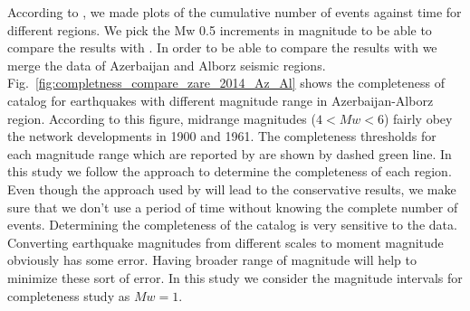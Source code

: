  According to   \citet{Frankel1995},  we made plots of the cumulative number of events against time for different regions. We pick the Mw 0.5 increments in magnitude to be able to compare the results with \citet{Zare2014}. In order to be able to compare the results with \citet{Zare2014} we merge the data of Azerbaijan and Alborz seismic regions.  Fig.~\ref{fig:completness_compare_zare_2014_Az_Al} shows the completeness of catalog for earthquakes with different magnitude range in Azerbaijan-Alborz region. According to this figure, midrange magnitudes ($ 4 < Mw < 6 $) fairly obey the network developments in 1900 and 1961. The completeness thresholds for each magnitude range which are reported by \citet{Zare2014} are shown by dashed green line. In this study we follow the \citet{Frankel1995} approach to determine the completeness of each region. Even though the approach used by \citet{Frankel1995} will lead to the conservative results, we make sure that we don't use a period of time without knowing the complete number of events. Determining the completeness of the catalog is very sensitive to the data. Converting earthquake magnitudes from different scales to moment magnitude obviously has some error. Having broader range of magnitude will help to minimize these sort of error. In this study we consider the magnitude intervals for completeness study as $Mw = 1$. 

